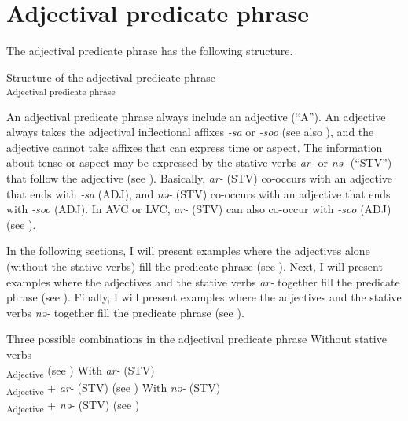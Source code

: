 \section{Adjectival predicate phrase}\label{sec:9.2}

The adjectival predicate phrase has the following structure.

\ea   Structure of the adjectival predicate phrase \label{ex:9.41}\\\textsubscript{Adjectival predicate phrase}
\z

An adjectival predicate phrase always include an adjective (“A”). An adjective always takes the adjectival inflectional affixes \textit{{}-sa} or \textit{{}-soo} (see also ), and the adjective cannot take affixes that can express time or aspect. The information about tense or aspect may be expressed by the stative verbs \textit{ar-} or \textit{nə-} (“STV”) that follow the adjective (see ). Basically, \textit{ar-} (STV) co-occurs with an adjective that ends with \textit{{}-sa} (ADJ), and \textit{nə-} (STV) co-occurs with an adjective that ends with \textit{{}-soo} (ADJ). In AVC or LVC, \textit{ar-} (STV) can also co-occur with \textit{{}-soo} (ADJ) (see ).

  In the following sections, I will present examples where the adjectives alone (without the stative verbs) fill the predicate phrase (see ). Next, I will present examples where the adjectives and the stative verbs \textit{ar-} together fill the predicate phrase (see ). Finally, I will present examples where the adjectives and the stative verbs \textit{nə-} together fill the predicate phrase (see ).

\ea   Three possible combinations in the adjectival predicate phrase\label{ex:9.42}
\ea Without stative verbs\\\textsubscript{Adjective}  (see )
\ex  With \textit{ar-} (STV)\\\textsubscript{Adjective}  + \textit{ar-} (STV)  (see )
\ex With \textit{nə-} (STV)\\\textsubscript{Adjective}  + \textit{nə-} (STV)  (see )
    \z
\z

